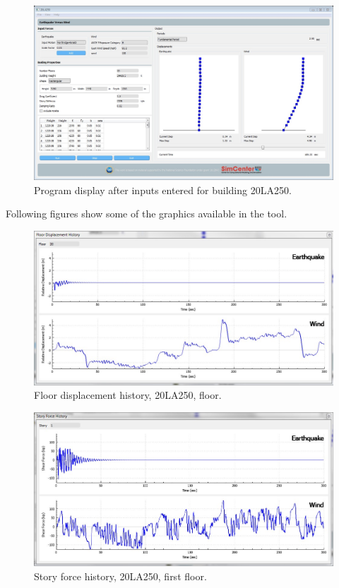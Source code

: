 \documentclass{simcenterdocumentation}
\begin{document}
\begin{figure}[H]
	\centering \includegraphics[width=0.9\linewidth]{20LA250_1.jpg}
	\caption{Program display after inputs entered for building 20LA250.}
\end{figure}
Following figures show some of the graphics available in the tool.
\begin{figure}[H]
	\centering \includegraphics[scale=0.35]{20LA250_fdh.JPG}
	\caption{Floor displacement history, 20LA250,  floor.}
\end{figure}
\begin{figure}[H]
	\centering \includegraphics[scale=0.35]{20LA250_sfh.jpg}
	\caption{Story force history, 20LA250, first floor.}
\end{figure}
\end{document}
